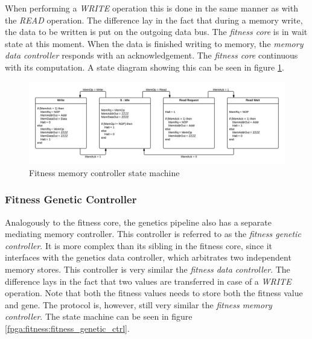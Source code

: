 When performing a \emph{WRITE} operation this is done in the same manner as with the \emph{READ} operation. The difference lay in the fact that during a memory write, the data to be written is put on the outgoing data bus. The \emph{fitness core} is in wait state at this moment. When the data is finished writing to memory, the \emph{memory data controller} responds with an acknowledgement. The \emph{fitness core} continuous with its computation.  
A state diagram showing this can be seen in figure \ref{fpga:fitness:fitness_memory_ctrl}.  



\begin{figure}[H]
\includegraphics[width=\textwidth]{fpga/fig/fitness_mem_ctrl.png}
\caption{Fitness memory controller state machine}
\label{fpga:fitness:fitness_memory_ctrl}
\end{figure}



\newpage
\subsubsection{Fitness Genetic Controller} 

Analogously to the fitness core, the genetics pipeline also has a separate mediating memory controller.
This controller is referred to as the \emph{fitness genetic controller}.
It is more complex than its sibling in the fitness core, since it interfaces with the genetics data controller, which arbitrates two independent memory stores. This controller is very similar the \emph{fitness data controller}. The difference lays in the fact that two values are transferred in case of a \emph{WRITE} operation. Note that both the fitness values needs to store both the fitness value and gene. The protocol is, however, still very similar the \emph{fitness memory controller}. The state machine can be seen in figure \ref{fpga:fitness:fitness_genetic_ctrl}. 



